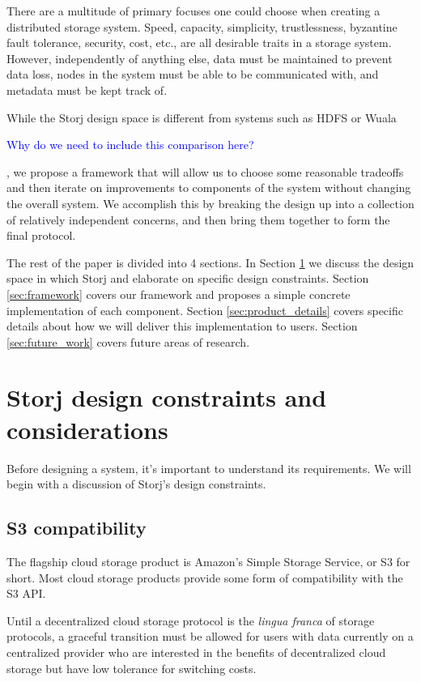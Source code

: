 \documentclass[a4paper,10pt]{article} \usepackage[utf8]{inputenc}
\begin{document}
There are a multitude of primary focuses one could choose when creating a
distributed storage system. Speed, capacity, simplicity, trustlessness,
byzantine fault tolerance, security, cost, etc., are all desirable traits in a
storage system. However, independently of anything else, data must be maintained to
prevent data loss, nodes in the system must be able to be communicated with, and
metadata must be kept track of.

While the Storj design space is different from systems such as HDFS or Wuala 

\textcolor{blue}{Why do we need
to include this comparison here?}

, we
propose a framework that will allow us to choose some reasonable tradeoffs and
then iterate on improvements to components of the system without changing the
overall system. We accomplish this by breaking the design up into a collection
of relatively independent concerns, and then bring them together to form the
final protocol.

The rest of the paper is divided into 4 sections. In Section
\ref{sec:design_constraints} we discuss the design space in which Storj and
elaborate on specific design constraints. Section \ref{sec:framework}
covers our framework and proposes a simple concrete implementation of each 
component. Section \ref{sec:product_details} covers specific details
about how we will deliver this implementation to users. Section
\ref{sec:future_work} covers future areas of research.

\section{Storj design constraints and
considerations}\label{sec:design_constraints}

Before designing a system, it's important to understand its requirements. 
We will begin with a discussion of Storj's design constraints.

\subsection{S3 compatibility}

The flagship cloud storage product is Amazon's Simple Storage Service, or S3 for
short. Most cloud storage products provide some form of compatibility with the
S3 API.

Until a decentralized cloud storage protocol is the {\em lingua franca} of
storage protocols, a graceful transition must be allowed for users with data
currently on a centralized provider who are interested in the benefits of
decentralized cloud storage but have low tolerance for switching costs.
\end{document}
